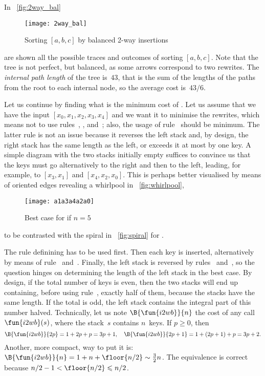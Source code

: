 In \fig~\vref{fig:2way_bal}
\begin{figure}
\centering
\texttt{[image: 2way\_bal]}
\caption{Sorting \([a,b,c]\) by balanced 2-way insertions}
\label{fig:2way_bal}
\end{figure}
are shown all the possible traces and
outcomes of sorting \([a,b,c]\). Note that the tree is not
perfect, but balanced, as some arrows
correspond to two rewrites. The \emph{internal path
  length}\label{insertion__internal_path_length}
 of the tree is~\(43\), that
is the sum of the lengths of the paths from the root to each internal
node, so the average cost is~\(43/6\).


Let us continue by finding what is the minimum cost of
. Let us assume that we have the input \([x_0, x_1, x_2,
x_3, x_4]\) and we want it to minimise the rewrites, which means not
to use rules~\clause{\sigma}, \clause{\tau}, \clause{\phi}
and~\clause{\chi}; also, the usage of rule~\clause{\rho} should be
minimum. The latter rule is not an issue because it reverses the left
stack and, by design, the right stack has the same length as the left,
or exceeds it at most by one key. A simple diagram with the two stacks
initially empty suffices to convince us that the keys must go
alternatively to the right and then to the left, leading, for example,
to \([x_3 , x_1]\) and \([x_4, x_2, x_0]\). This is perhaps better
visualised by means of oriented edges revealing a whirlpool in
\fig~\vref{fig:whirlpool},
\begin{figure}[b]
\centering
\texttt{[image: a1a3a4a2a0]}
\caption{Best case for  if \(n=5\)}
\label{fig:whirlpool}
\end{figure}
to be contrasted with the spiral in \fig~\vref{fig:spiral} for
.

The rule definining  has to be used first. Then each key is
inserted, alternatively by means of rule~\clause{\upsilon}
and~\clause{\psi}. Finally, the left stack is reversed by
rules~\clause{\pi} and~\clause{\rho}, so the question hinges on
determining the length of the left stack in the best case. By design,
if the total number of keys is even, then the two stacks will end up
containing, before using rule~\clause{\rho}, exactly half of them,
because the stacks have the same length. If the total is odd, the left
stack contains the integral part of this number halved. Technically,
let us note \(\B{\fun{i2wb}}{n}\) the cost of any call
\(\fun{i2wb}(s)\), where the stack~\(s\) contains \(n\)~keys. If \(p
\geqslant 0\), then
\begin{equation*}
\B{\fun{i2wb}}{2p}   = 1 +     2p + p = 3p + 1,\quad
\B{\fun{i2wb}}{2p+1} = 1 + (2p+1) + p = 3p + 2.
\end{equation*}
Another, more compact, way to put it is: \(\B{\fun{i2wb}}{n} = 1 + n
+ \floor{n/2} \sim \tfrac{3}{2}{n}\). The equivalence is correct
because \(n/2-1 < \floor{n/2} \leqslant n/2\).

